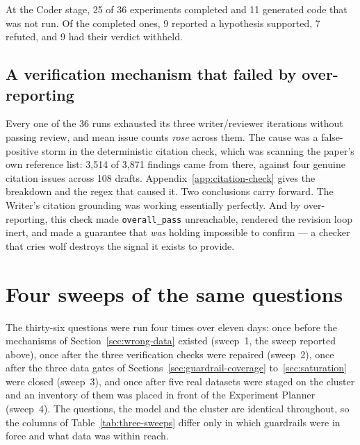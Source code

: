 At the Coder stage, 25 of 36 experiments completed and 11 generated code that was
not run. Of the completed ones, 9 reported a hypothesis supported, 7 refuted, and
9 had their verdict withheld.

\subsection{A verification mechanism that failed by over-reporting}
\label{sec:citation-overreport}

Every one of the 36 runs exhausted its three writer/reviewer iterations without
passing review, and mean issue counts \emph{rose} across them. The cause was a
false-positive storm in the deterministic citation check, which was scanning the
paper's own reference list: 3{,}514 of 3{,}871 findings came from there, against
four genuine citation issues across 108 drafts.
Appendix~\ref{app:citation-check} gives the breakdown and the regex that caused
it. Two conclusions carry forward. The Writer's citation grounding was working
essentially perfectly. And by over-reporting, this check made
\texttt{overall\_pass} unreachable, rendered the revision loop inert, and made a
guarantee that \emph{was} holding impossible to confirm --- a checker that cries
wolf destroys the signal it exists to provide.

\section{Four sweeps of the same questions}
\label{sec:three-sweeps}

The thirty-six questions were run four times over eleven days: once before the
mechanisms of Section~\ref{sec:wrong-data} existed (sweep~1, the sweep reported
above), once after the three verification checks were repaired (sweep~2), once
after the three data gates of Sections~\ref{sec:guardrail-coverage}
to~\ref{sec:saturation} were closed (sweep~3), and once after five real datasets
were staged on the cluster and an inventory of them was placed in front of the
Experiment Planner (sweep~4). The questions, the model and the cluster are
identical throughout, so the columns of Table~\ref{tab:three-sweeps} differ only
in which guardrails were in force and what data was within reach.

